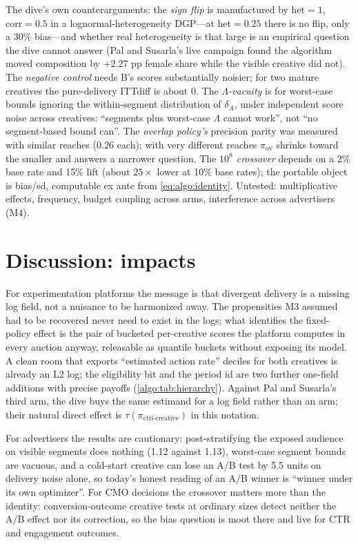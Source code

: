The dive's own counterarguments: the \emph{sign flip} is manufactured by $\mathrm{het} = 1$, $\mathrm{corr} = 0.5$ in a lognormal-heterogeneity DGP---at $\mathrm{het} = 0.25$ there is no flip, only a 30\% bias---and whether real heterogeneity is that large is an empirical question the dive cannot answer (Pal and Susarla's live campaign found the algorithm moved composition by $+2.27$ pp female share while the visible creative did not). The \emph{negative control} needs B's scores substantially noisier; for two mature creatives the pure-delivery ITTdiff is about 0. The \emph{$\Lambda$-vacuity} is for worst-case bounds ignoring the within-segment distribution of $\delta_A$, under independent score noise across creatives: ``segments plus worst-case $\Lambda$ cannot work'', not ``no segment-based bound can''. The \emph{overlap policy's} precision parity was measured with similar reaches (0.26 each); with very different reaches $\pi_{\mathrm{ov}}$ shrinks toward the smaller and answers a narrower question. The \emph{$10^8$ crossover} depends on a 2\% base rate and 15\% lift (about $25\times$ lower at 10\% base rates); the portable object is bias/sd, computable ex ante from \cref{eq:algo:identity}. Untested: multiplicative effects, frequency, budget coupling across arms, interference across advertisers (M4).

\section{Discussion: impacts}

For experimentation platforms the message is that divergent delivery is a missing log field, not a nuisance to be harmonized away. The propensities M3 assumed had to be recovered never need to exist in the logs; what identifies the fixed-policy effect is the pair of bucketed per-creative scores the platform computes in every auction anyway, releasable as quantile buckets without exposing its model. A clean room that exports ``estimated action rate'' deciles for both creatives is already an L2 log; the eligibility bit and the period id are two further one-field additions with precise payoffs (\cref{algo:tab:hierarchy}). Against Pal and Susarla's third arm, the dive buys the same estimand for a log field rather than an arm; their natural direct effect is $\tau(\pi_{\text{ctrl-creative}})$ in this notation.

For advertisers the results are cautionary: post-stratifying the exposed audience on visible segments does nothing (1.12 against 1.13), worst-case segment bounds are vacuous, and a cold-start creative can lose an A/B test by 5.5 units on delivery noise alone, so today's honest reading of an A/B winner is ``winner under its own optimizer''. For CMO decisions the crossover matters more than the identity: conversion-outcome creative tests at ordinary sizes detect neither the A/B effect nor its correction, so the bias question is moot there and live for CTR and engagement outcomes.


